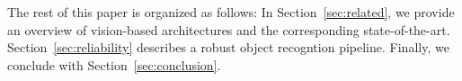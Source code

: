 The rest of this paper is organized as follows:
In Section~\ref{sec:related}, we provide an overview of vision-based architectures and the corresponding state-of-the-art.
Section~\ref{sec:reliability} describes a robust object recogntion pipeline.
Finally, we conclude with Section~\ref{sec:conclusion}.


